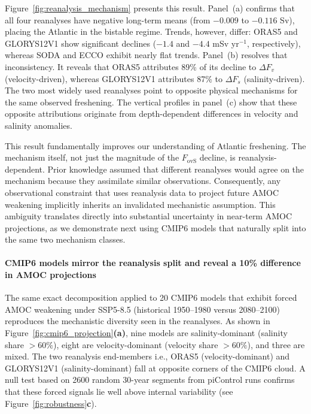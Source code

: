 \documentclass[11pt,a4paper]{article}
\begin{document}
Figure~\ref{fig:reanalysis_mechanism} presents this result. Panel~(a) confirms that all four reanalyses have negative long-term means (from \(-0.009\) to \(-0.116\) Sv), placing the Atlantic in the bistable regime. Trends, however, differ: ORAS5 and GLORYS12V1 show significant declines (\(-1.4\) and \(-4.4\) mSv yr\(^{-1}\), respectively), whereas SODA and ECCO exhibit nearly flat trends. Panel~(b) resolves that inconsistency. It reveals that ORAS5 attributes 89\% of its decline to \(\Delta F_v\) (velocity-driven), whereas GLORYS12V1 attributes 87\% to \(\Delta F_s\) (salinity-driven). The two most widely used reanalyses point to opposite physical mechanisms for the same observed freshening. The vertical profiles in panel~(c) show that these opposite attributions originate from depth-dependent differences in velocity and salinity anomalies.

This result fundamentally improves our understanding of Atlantic freshening. The mechanism itself, not just the magnitude of the \(F_{\mathrm{ovS}}\) decline, is reanalysis-dependent. Prior knowledge assumed that different reanalyses would agree on the mechanism because they assimilate similar observations. Consequently, any observational constraint that uses reanalysis data to project future AMOC weakening implicitly inherits an invalidated mechanistic assumption. This ambiguity translates directly into substantial uncertainty in near-term AMOC projections, as we demonstrate next using CMIP6 models that naturally split into the same two mechanism classes.

\paragraph*{CMIP6 models mirror the reanalysis split and reveal a 10\% difference in AMOC projections}

The same exact decomposition applied to 20 CMIP6 models that exhibit forced AMOC weakening under SSP5-8.5 (historical 1950--1980 versus 2080--2100) reproduces the mechanistic diversity seen in the reanalyses. As shown in Figure~\ref{fig:cmip6_projection}\textbf{(a)}, nine models are salinity-dominant (salinity share \(>60\%\)), eight are velocity-dominant (velocity share \(>60\%\)), and three are mixed. The two reanalysis end-members i.e., ORAS5 (velocity-dominant) and GLORYS12V1 (salinity-dominant) fall at opposite corners of the CMIP6 cloud. A null test based on 2600 random 30-year segments from piControl runs confirms that these forced signals lie well above internal variability (see Figure~\ref{fig:robustness}\textbf{c}).
\end{document}
